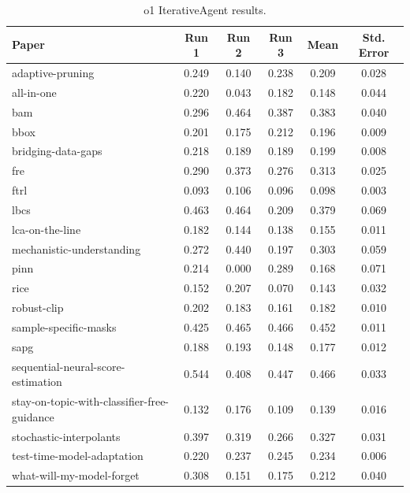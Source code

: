 \documentclass{article}
\theoremstyle{plain}
\theoremstyle{definition}
\theoremstyle{remark}
\begin{document}
\begin{table}[tb]
\caption{o1 IterativeAgent results.}
\label{tab:o1-results-iterative}
\vskip 0.15in
\begin{center}
\begin{small}
\begin{sc}
\begin{tabular}{l c c c c c}
\toprule
\textbf{Paper} & \textbf{Run 1} & \textbf{Run 2} & \textbf{Run 3} & \textbf{Mean} & \textbf{Std. Error} \\
\midrule
adaptive-pruning & 0.249 & 0.140 & 0.238 & 0.209 & 0.028 \\
all-in-one & 0.220 & 0.043 & 0.182 & 0.148 & 0.044 \\
bam & 0.296 & 0.464 & 0.387 & 0.383 & 0.040 \\
bbox & 0.201 & 0.175 & 0.212 & 0.196 & 0.009 \\
bridging-data-gaps & 0.218 & 0.189 & 0.189 & 0.199 & 0.008 \\
fre & 0.290 & 0.373 & 0.276 & 0.313 & 0.025 \\
ftrl & 0.093 & 0.106 & 0.096 & 0.098 & 0.003 \\
lbcs & 0.463 & 0.464 & 0.209 & 0.379 & 0.069 \\
lca-on-the-line & 0.182 & 0.144 & 0.138 & 0.155 & 0.011 \\
mechanistic-understanding & 0.272 & 0.440 & 0.197 & 0.303 & 0.059 \\
pinn & 0.214 & 0.000 & 0.289 & 0.168 & 0.071 \\
rice & 0.152 & 0.207 & 0.070 & 0.143 & 0.032 \\
robust-clip & 0.202 & 0.183 & 0.161 & 0.182 & 0.010 \\
sample-specific-masks & 0.425 & 0.465 & 0.466 & 0.452 & 0.011 \\
sapg & 0.188 & 0.193 & 0.148 & 0.177 & 0.012 \\
sequential-neural-score-estimation & 0.544 & 0.408 & 0.447 & 0.466 & 0.033 \\
stay-on-topic-with-classifier-free-guidance & 0.132 & 0.176 & 0.109 & 0.139 & 0.016 \\
stochastic-interpolants & 0.397 & 0.319 & 0.266 & 0.327 & 0.031 \\
test-time-model-adaptation & 0.220 & 0.237 & 0.245 & 0.234 & 0.006 \\
what-will-my-model-forget & 0.308 & 0.151 & 0.175 & 0.212 & 0.040 \\
\bottomrule
\end{tabular}
\end{sc}
\end{small}
\end{center}
\vskip -0.1in
\end{table}
\end{document}
